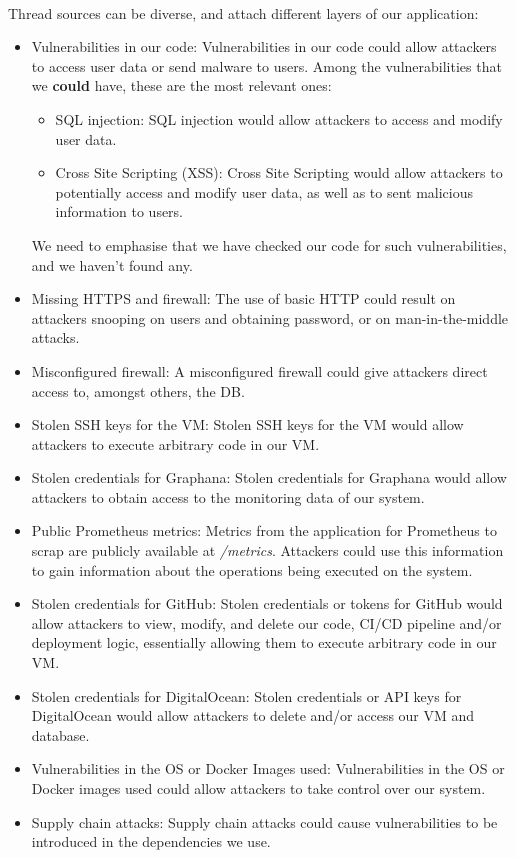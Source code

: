 \paragraph{} Thread sources can be diverse, and attach different layers of our application:
\begin{itemize}
	\item Vulnerabilities in our code: Vulnerabilities in our code could allow attackers to access user data or send malware to users. Among the vulnerabilities that we \textbf{could} have, these are the most relevant ones:
	\begin{itemize}
		\item SQL injection: SQL injection would allow attackers to access and modify user data.
		\item Cross Site Scripting (XSS): Cross Site Scripting would allow attackers to potentially access and modify user data, as well as to sent malicious information to users.
	\end{itemize}
	We need to emphasise that we have checked our code for such vulnerabilities, and we haven't found any.
	\item Missing HTTPS and firewall: The use of basic HTTP could result on attackers snooping on users and obtaining password, or on man-in-the-middle attacks.
	\item Misconfigured firewall: A misconfigured firewall could give attackers direct access to, amongst others, the DB.
	\item Stolen SSH keys for the VM: Stolen SSH keys for the VM would allow attackers to execute arbitrary code in our VM.
	\item Stolen credentials for Graphana: Stolen credentials for Graphana would allow attackers to obtain access to the monitoring data of our system.
	\item Public Prometheus metrics: Metrics from the application for Prometheus to scrap are publicly available at \textit{/metrics}. Attackers could use this information to gain information about the operations being executed on the system.
	\item Stolen credentials for GitHub: Stolen credentials or tokens for GitHub would allow attackers to view, modify, and delete our code, CI/CD pipeline and/or deployment logic, essentially allowing them to execute arbitrary code in our VM.
	\item Stolen credentials for DigitalOcean: Stolen credentials or API keys for DigitalOcean would allow attackers to delete and/or access our VM and database.
	\item Vulnerabilities in the OS or Docker Images used: Vulnerabilities in the OS or Docker images used could allow attackers to take control over our system.
	\item Supply chain attacks: Supply chain attacks could cause vulnerabilities to be introduced in the dependencies we use.
\end{itemize}

